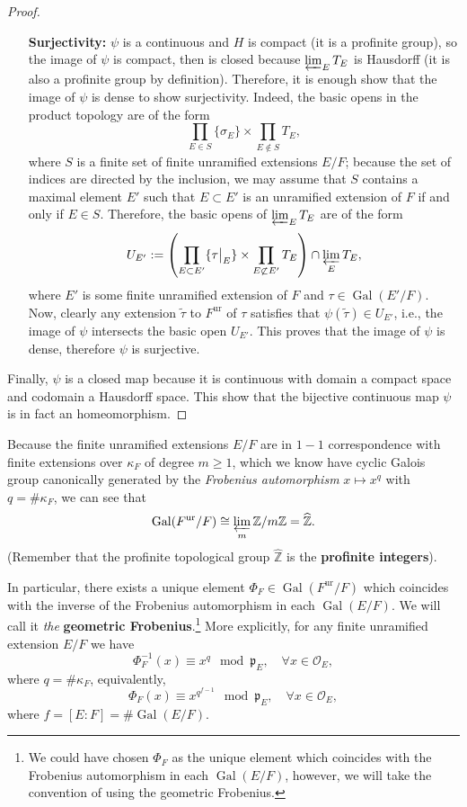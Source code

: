 \documentclass[12pt]{article}
\theoremstyle{plain}
\theoremstyle{definition}
\newcommand{\integers}{\mathbb{Z}}
\renewcommand{\hat}[1]{\widehat{#1}}
\renewcommand{\tilde}[1]{\widetilde{#1}}
\newcommand\rest[2]{{%
  \left.\kern-\nulldelimiterspace %
  #1 %
  \vphantom{\big|} %
  \right|_{#2} %
  }}
\newcommand{\Gal}[2]{\operatorname{Gal} ( #1 / #2 )}
\newcommand{\primo}[1]{\mathfrak{#1}}
\renewcommand{\O}{\mathcal{O}}
\newcommand{\ur}[1]{{#1}^{\operatorname{ur}}}
\begin{document}
\begin{proof}
\begin{enumerate}
\item[\textbf{Surjectivity:}] $\psi$ is a continuous and $H$ is compact (it is a profinite group), so the image of $\psi$ is compact, then is closed because $\varprojlim_E T_E$ is Hausdorff (it is also a profinite group by definition). Therefore, it is enough show that the image of $\psi$ is dense to show surjectivity. Indeed, the basic opens in the product topology are of the form
\[
    \prod_{E \in S} \{ \sigma_E\} \times \prod_{E \not \in S} T_E,
\]
where $S$ is a finite set of finite unramified extensions $E/F$; because the set of indices are directed by the inclusion, we may assume that $S$ contains a maximal element $E'$ such that $E \subset E'$ is an unramified extension of $F$ if and only if $E \in S$. Therefore, the basic opens of $\varprojlim_E T_E$ are of the form
\[
    U_{E'} := \left (\prod_{E \subset E'} \{\rest{\tau}{E}\} \times \prod_{E \not \subset E'} T_E \right ) \cap \varprojlim_E T_E,
\]
where $E'$ is some finite unramified extension of $F$ and $\tau \in \Gal {E'} F$. Now, clearly any extension $\tilde \tau $ to $\ur F$ of $\tau$ satisfies that $\psi (\tilde \tau) \in U_{E'}$, i.e., the image of $\psi$ intersects the basic open $U_{E'}$. This proves that the image of $\psi$ is dense, therefore $\psi$ is surjective.
\end{enumerate}

Finally, $\psi$ is a closed map because it is continuous with domain a compact space and codomain a Hausdorff space. This show that the bijective continuous map $\psi$ is in fact an homeomorphism.
\end{proof}


Because the finite unramified extensions $E/F$ are in $1-1$ correspondence with finite extensions over $\kappa_F$ of degree $m \geq 1$, which we know have cyclic Galois group canonically generated by the \textit{Frobenius automorphism} $x \mapsto x^q$ with $q = \# \kappa_F$, we can see that
\[
 \Gal {\ur F} F \cong \varprojlim_m \integers /m \integers = \hat \integers.
\]
(Remember that the profinite topological group $\hat \integers$ is the \textbf{profinite integers}).

In particular, there exists a unique element $\Phi_F \in \Gal {\ur F} F$ which coincides with the inverse of the Frobenius automorphism in each $\Gal E F$. We will call it \textit{the} \textbf{geometric Frobenius}.\footnote{We could have chosen $\Phi_F$ as the unique element which coincides with the Frobenius automorphism in each $\Gal E F$, however, we will take the convention of using the geometric Frobenius.} More explicitly, for any finite unramified extension $E/F$ we have
\begin{equation}\label{eq:action of a frobenius element (not geometric)}
\Phi_F^{-1} (x) \equiv x^{q} \mod \primo p_E, \quad \forall x \in \O_E,
\end{equation}
where $q = \# \kappa_F$, equivalently,
\[
    \Phi_F (x) \equiv x^{q^{f-1}} \mod \primo p_E, \quad \forall x \in \O_E,
\]
where $f = [E: F] = \# \Gal E F$.
\end{document}
